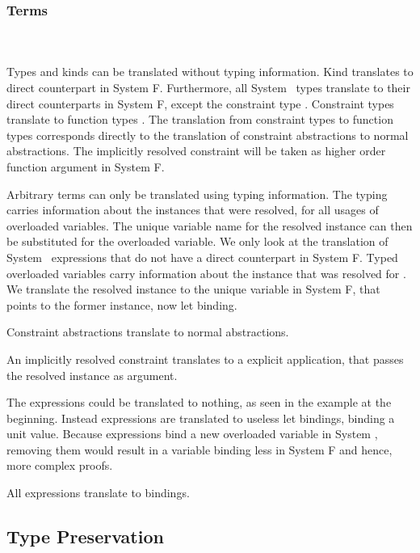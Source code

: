 \subsubsection{Terms}\hfill\\\\
Types and kinds can be translated without typing information. Kind  translates to direct counterpart in System F. 
Furthermore, all System \Fo\ types translate to their direct counterparts in System F, except the constraint type \Constr{[}  \Constr{:}  \Constr{]⇒} .
\DPTType
Constraint types \Constr{[}  \Constr{:}  \Constr{]⇒}  translate to function types   . 
The translation from constraint types to function types corresponds directly to the translation of constraint abstractions to normal abstractions. 
The implicitly resolved constraint will be taken as higher order function argument in System F.

\noindent Arbitrary terms can only be translated using typing information. 
The typing carries information about the instances that were resolved, for all usages of overloaded variables. 
The unique variable name for the resolved instance can then be substituted for the overloaded variable. 
We only look at the translation of System \Fo\ expressions that do not have a direct counterpart in System F.
\DPTTerms
Typed overloaded variables  carry information about the instance that was resolved for .
We translate the resolved instance to the unique variable in System F, that points to the former instance, now let binding. 

\noindent Constraint abstractions translate to normal abstractions. 

\noindent An implicitly resolved constraint translates to a explicit application, that passes the resolved instance as argument. 

\noindent  The  expressions could be translated to nothing, as seen in the example at the beginning. 
Instead  expressions are translated to useless let bindings, binding a unit value.
Because  expressions bind a new overloaded variable in System \Fo, removing them would result in a variable binding less in System F and hence, more complex proofs.

\noindent All  expressions translate to  bindings.

\subsection{Type Preservation}
